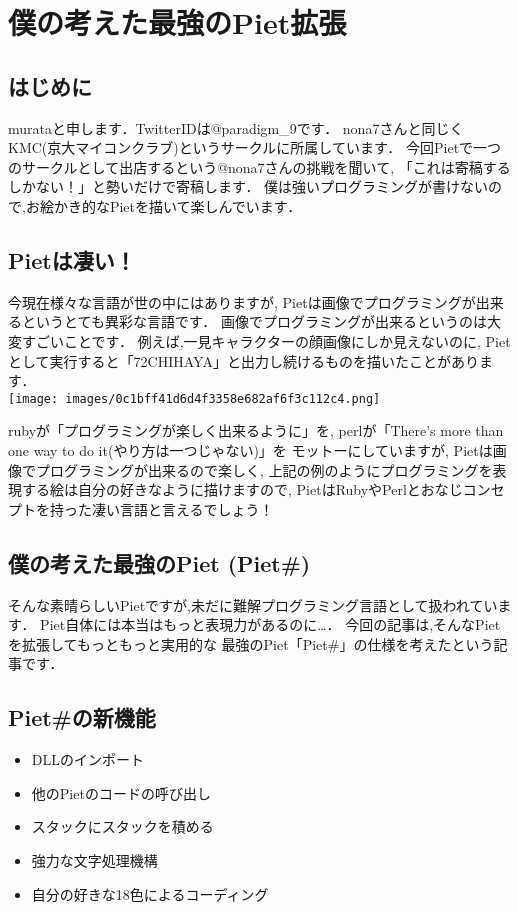 \chapter{僕の考えた最強のPiet拡張}

\section{はじめに}

murataと申します．TwitterIDは@paradigm\_9です．
nona7さんと同じくKMC(京大マイコンクラブ)というサークルに所属しています．
今回Pietで一つのサークルとして出店するという@nona7さんの挑戦を聞いて,
「これは寄稿するしかない！」と勢いだけで寄稿します．
僕は強いプログラミングが書けないので,お絵かき的なPietを描いて楽しんでいます．

\section{Pietは凄い！}

今現在様々な言語が世の中にはありますが,
Pietは画像でプログラミングが出来るというとても異彩な言語です．
画像でプログラミングが出来るというのは大変すごいことです．
例えば,一見キャラクターの顔画像にしか見えないのに,
Pietとして実行すると「72CHIHAYA」と出力し続けるものを描いたことがあります．\\\texttt{[image: images/0c1bff41d6d4f3358e682af6f3c112c4.png]}

rubyが「プログラミングが楽しく出来るように」を, perlが「There's more
than one way to do it(やり方は一つじゃない)」を モットーにしていますが,
Pietは画像でプログラミングが出来るので楽しく,
上記の例のようにプログラミングを表現する絵は自分の好きなように描けますので,
PietはRubyやPerlとおなじコンセプトを持った凄い言語と言えるでしょう！

\section{僕の考えた最強のPiet (Piet\#)}

そんな素晴らしいPietですが,未だに難解プログラミング言語として扱われています．
Piet自体には本当はもっと表現力があるのに\ldots{}．
今回の記事は,そんなPietを拡張してもっともっと実用的な
最強のPiet「Piet\#」の仕様を考えたという記事です．

\section{Piet\#の新機能}

\begin{itemize}
\item
  DLLのインポート
\item
  他のPietのコードの呼び出し
\item
  スタックにスタックを積める
\item
  強力な文字処理機構
\item
  自分の好きな18色によるコーディング
\end{itemize}

